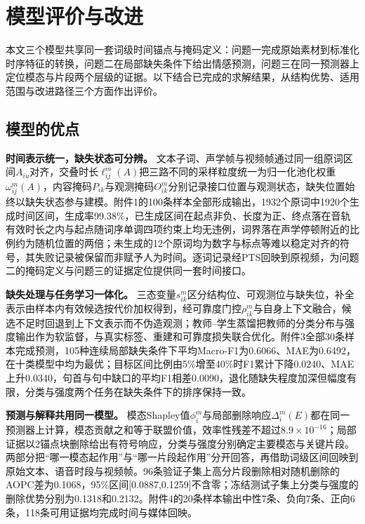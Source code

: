 \section{模型评价与改进}

本文三个模型共享同一套词级时间锚点与掩码定义：问题一完成原始素材到标准化时序特征的转换，问题二在局部缺失条件下给出情感预测，问题三在同一预测器上定位模态与片段两个层级的证据。以下结合已完成的求解结果，从结构优势、适用范围与改进路径三个方面作出评价。

\subsection{模型的优点}

\textbf{时间表示统一，缺失状态可分辨。} 文本子词、声学帧与视频帧通过同一组原词区间$A_{iu}$对齐，交叠时长$\ell^m_{ij}(A)$把三路不同的采样粒度统一为归一化池化权重$\omega^m_{ij}(A)$，内容掩码$P_{ik}$与观测掩码$O^m_{ik}$分别记录接口位置与观测状态，缺失位置始终以缺失状态参与建模。附件1的100条样本全部形成输出，1932个原词中1920个生成时间区间，生成率99.38\%，已生成区间在起点非负、长度为正、终点落在音轨有效时长之内与起点随词序单调四项约束上均无违例，词界落在声学停顿附近的比例约为随机位置的两倍；未生成的12个原词均为数字与标点等难以稳定对齐的符号，其失败记录被保留而非赋予人为时间。逐词记录经PTS回映到原视频，为问题二的掩码定义与问题三的证据定位提供同一套时间接口。

\textbf{缺失处理与任务学习一体化。} 三态变量$s^m_{ik}$区分结构位、可观测位与缺失位，补全表示由样本内有效候选按代价加权得到，经可靠度门控$\rho^m_{ik}$与自身上下文融合，候选不足时回退到上下文表示而不伪造观测；教师--学生蒸馏把教师的分类分布与强度输出作为软监督，与真实标签、重建和可靠度损失联合优化。附件3全部30条样本完成预测，105种连续局部缺失条件下平均Macro-F1为0.6066、MAE为0.6492，在十类模型中均为最优；目标区间比例由5\%增至40\%时F1累计下降0.0240、MAE上升0.0340，句首与句中缺口的平均F1相差0.0090，退化随缺失程度加深但幅度有限，分类与强度两个任务在缺失条件下的排序保持一致。

\textbf{预测与解释共用同一模型。} 模态Shapley值$\phi_i^m$与局部删除响应$\Delta_i^m(E)$都在同一预测器上计算，模态贡献之和等于联盟价值，效率性残差不超过$8.9\times10^{-16}$；局部证据以2锚点块删除给出有符号响应，分类与强度分别确定主要模态与关键片段。两部分把``哪一模态起作用''与``哪一片段起作用''分开回答，再借助词级区间回映到原始文本、语音时段与视频帧。96条验证子集上高分片段删除相对随机删除的AOPC差为0.1068，95\%区间[0.0887,0.1259]不含零；冻结测试子集上分类与强度的删除优势分别为0.1318和0.2132。附件4的20条样本输出中性7条、负向7条、正向6条，118条可用证据均完成时间与媒体回映。

